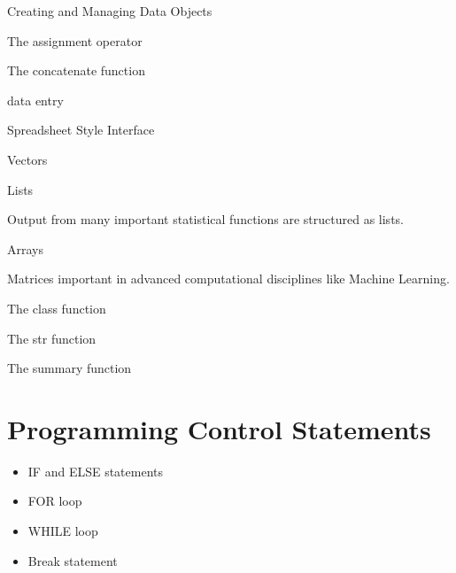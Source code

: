 


Creating and Managing Data Objects


The assignment operator

The concatenate function

data entry

Spreadsheet Style Interface

Vectors

Lists

Output from many important statistical functions are structured as lists.

Arrays

Matrices important in advanced computational disciplines like Machine Learning.


The class function

The str function

 

The summary function


\newpage

\section{Programming Control Statements}

\begin{itemize}
\item IF and ELSE statements
\item FOR loop
\item WHILE loop
\item Break statement
\end{itemize}

